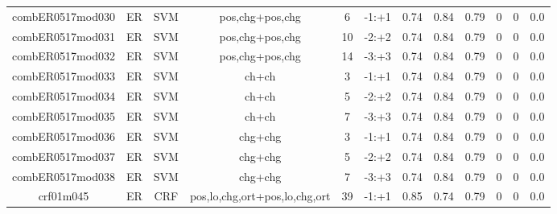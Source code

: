 \documentclass[a4paper]{article}
\begin{document}
\begin{landscape}
\begin{center}
\begin{tabular}{ |c|c|c|c|c|c|c|c|c|c|c|c|}
 	
 		
 		\small{ combER0517mod030 } & ER & SVM & pos,chg+pos,chg  &  6 &  -1:+1  &  0.74 & 0.84 & 0.79  &  0 & 0 & 0.0 \\
 		

 	
 
 	
 		
 		\small{ combER0517mod031 } & ER & SVM & pos,chg+pos,chg  &  10 &  -2:+2  &  0.74 & 0.84 & 0.79  &  0 & 0 & 0.0 \\
 		

 	
 
 	
 		
 		\small{ combER0517mod032 } & ER & SVM & pos,chg+pos,chg  &  14 &  -3:+3  &  0.74 & 0.84 & 0.79  &  0 & 0 & 0.0 \\
 		

 	
 
 	
 		
 		\small{ combER0517mod033 } & ER & SVM & ch+ch  &  3 &  -1:+1  &  0.74 & 0.84 & 0.79  &  0 & 0 & 0.0 \\
 		

 	
 
 	
 		
 		\small{ combER0517mod034 } & ER & SVM & ch+ch  &  5 &  -2:+2  &  0.74 & 0.84 & 0.79  &  0 & 0 & 0.0 \\
 		

 	
 
 	
 		
 		\small{ combER0517mod035 } & ER & SVM & ch+ch  &  7 &  -3:+3  &  0.74 & 0.84 & 0.79  &  0 & 0 & 0.0 \\
 		

 	
 
 	
 		
 		\small{ combER0517mod036 } & ER & SVM & chg+chg  &  3 &  -1:+1  &  0.74 & 0.84 & 0.79  &  0 & 0 & 0.0 \\
 		

 	
 
 	
 		
 		\small{ combER0517mod037 } & ER & SVM & chg+chg  &  5 &  -2:+2  &  0.74 & 0.84 & 0.79  &  0 & 0 & 0.0 \\
 		

 	
 
 	
 		
 		\small{ combER0517mod038 } & ER & SVM & chg+chg  &  7 &  -3:+3  &  0.74 & 0.84 & 0.79  &  0 & 0 & 0.0 \\
 		

 	
 
 	
 		
 		\small{ crf01m045 } & ER & CRF & pos,lo,chg,ort+pos,lo,chg,ort  &  39 &  -1:+1  &  0.85 & 0.74 & 0.79  &  0 & 0 & 0.0 \\
 		


\end{tabular}
\end{center}
\end{landscape}
\end{document}
